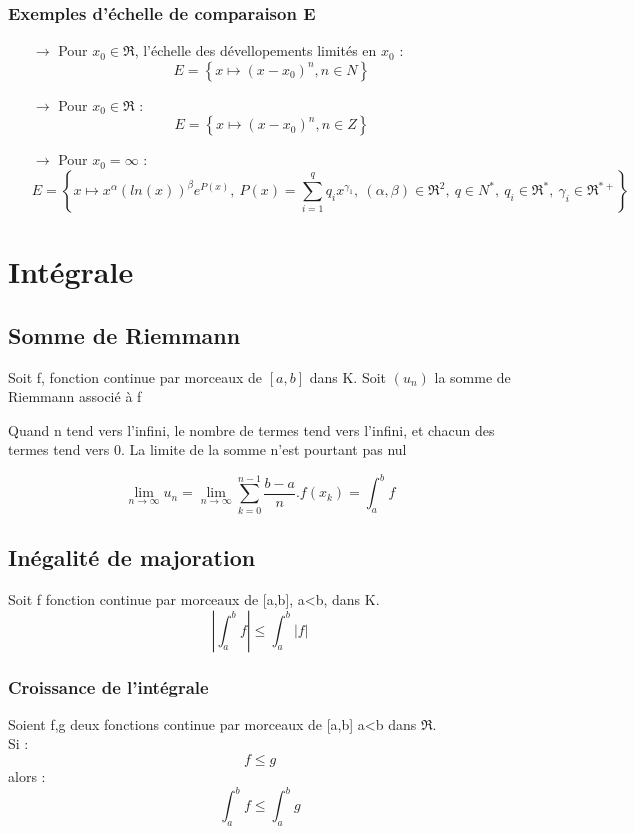 \subsubsection{Exemples d'échelle de comparaison E}
\begin{itemize}
 \item[$\rightarrow$] Pour $x_0 \in \Re$, l'échelle des dévellopements limités en $x_0$ :
$$E = \left\lbrace x \mapsto (x-x_0)^n, n \in N \right\rbrace $$
 \item[$\rightarrow$] Pour $x_0 \in \Re$ :
$$E = \left\lbrace x \mapsto (x-x_0)^n, n \in Z \right\rbrace $$
 \item[$\rightarrow$] Pour $x_0 = \infty $ :
$$E = \left\lbrace x \mapsto x^{\alpha}(ln(x))^{\beta}e^{P(x)},~ P(x) = \sum_{i=1}^q q_ix^{\gamma_1}, ~(\alpha,\beta) \in \Re^2,~ q \in N^*,~ q_i \in \Re^*,~ \gamma_i \in \Re^{*+} \right\rbrace $$

\end{itemize}

\section{Intégrale}
\subsection{Somme de Riemmann}
Soit f, fonction continue par morceaux de $\left[a,b\right]$ dans K.
Soit $(u_n)$ la somme de Riemmann associé à f
\begin{prop}
Quand n tend vers l'infini, le nombre de termes tend vers l'infini, et chacun des termes tend vers 0. La limite de la somme n'est pourtant pas nul
\end{prop}
\begin{prop}
$$\lim_{n \rightarrow \infty} u_n = \lim_{n \rightarrow \infty} \sum_{k=0}^{n-1} \dfrac{b-a}{n}.f(x_k) = \int_a^b f$$
\end{prop}
\subsection{Inégalité de majoration}
\begin{prop}
Soit f fonction continue par morceaux de [a,b], a<b, dans K.\\
$$|\int_a^b f| \leq \int_a^b |f| $$
\end{prop}
\subsubsection{Croissance de l'intégrale}
\begin{prop}
Soient f,g deux fonctions continue par morceaux de [a,b] a<b dans $\Re$.\\
Si :
$$f \leq g$$
alors :
$$\int_a^b f \leq \int_a^b g$$
\end{prop}
